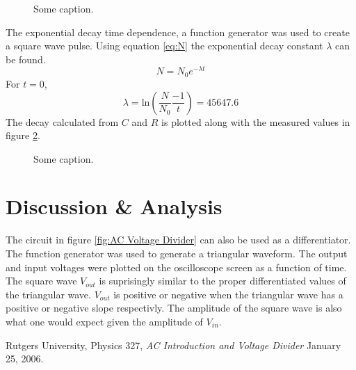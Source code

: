 \documentclass[11pt,onecolumn]{article}
\begin{document}
\begin{figure}

\caption{Some caption.}\label{fig:plot02}
\end{figure}


The exponential decay time dependence, a function generator was used to create a square wave pulse. Using equation \ref{eq:N} the exponential decay constant $\lambda$ can be found.
\begin{equation}\label{eq:N}
N = N_0 e^{- \lambda t}
\end{equation}
For $t = 0$,
\begin{displaymath}
\lambda = \mathrm{ln}\left(\frac{N}{N_0} \frac{-1}{t}\right) = 45647.6
\end{displaymath}
The decay calculated from $C$ and $R$ is plotted along with the measured values in figure \ref{fig:plot03}.
\begin{figure}

\caption{Some caption.}\label{fig:plot03}
\end{figure}

\section{Discussion \& Analysis}\label{sec:Discussion}
The circuit in figure \ref{fig:AC Voltage Divider} can also be used as a differentiator. The function generator was used to generate a triangular waveform. The output and input voltages were plotted on the oscilloscope screen as a function of time. The square wave $V_{out}$ is suprisingly similar to the proper differentiated values of the triangular wave. $V_{out}$ is positive or negative when the triangular wave has a positive or negative slope respectivly. The amplitude of the square wave is also what one would expect given the amplitude of $V_{in}$.

\begin{thebibliography}{9}
 Rutgers University, Physics 327, {\em AC Introduction and Voltage Divider} January 25, 2006.
\end{thebibliography}
\end{document}
